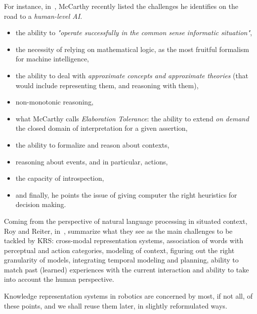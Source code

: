 \documentclass[a4paper, twocolumn]{article}
\begin{document}
For instance, in~\cite{McCarthy2007}, McCarthy recently listed the challenges
he identifies on the road to a \emph{human-level AI}.

\begin{itemize}

	\item the ability to \emph{"operate successfully in the common sense
	informatic situation"},

	\item the necessity of relying on mathematical logic, as the most fruitful
	formalism for machine intelligence,

	\item the ability to deal with \emph{approximate concepts and approximate
	theories} (that would include representing them, and reasoning with them),

	\item non-monotonic reasoning,

	\item what McCarthy calls \emph{Elaboration Tolerance}: the ability to
	extend \emph{on demand} the closed domain of interpretation for a
	given assertion,

	\item the ability to formalize and reason about contexts,

	\item reasoning about events, and in particular, actions,

	\item the capacity of introspection,

	\item and finally, he points the issue of giving computer the right
	heuristics for decision making.

\end{itemize}

Coming from the perspective of natural language processing in situated context,
Roy and Reiter, in~\cite{Roy2005}, summarize what they see as the main
challenges to be tackled by KRS: cross-modal representation systems, association of
words with perceptual and action categories, modeling of context, figuring out
the right granularity of models, integrating temporal modeling and planning,
ability to match past (learned) experiences with the current interaction and
ability to take into account the human perspective.

Knowledge representation systems in robotics are concerned by most, if not all,
of these points, and we shall reuse them later, in slightly reformulated ways.
\end{document}
